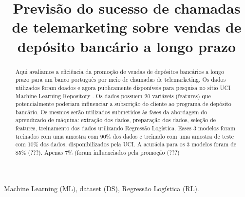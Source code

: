\documentclass[twoside,conference,a4paper]{IEEEtran}
\begin{document}
\renewcommand{\IEEEkeywordsname}{Palavras-chave}


\title{Previsão do sucesso de chamadas de telemarketing sobre vendas de depósito bancário a longo prazo}
\author{%
               
}


\maketitle

\begin{abstract}
Aqui avaliamos a eficiência da promoção de vendas de depósitos bancários a longo prazo para um banco português por meio de chamadas de telemarketing. Os dados utilizados foram doados e agora publicamente disponíveis para pesquisa no sítio UCI Machine Learning Repository \cite{UCI:2014}. Os dados possuem 20 variáveis (features) que potencialmente poderiam influenciar a subscrição do cliente ao programa de depósito bancário. Os mesmos serão utilizados submetidos às fases da abordagem do aprendizado de máquina: extração dos dados, preparação dos dados, seleção de features, treinamento dos dados utilizando Regressão Logística. Esses 3 modelos foram treinados com uma amostra com 90\% dos dados e treinado com uma amostra de teste com 10\% dos dados, disponibilizados pela UCI. A acurácia para os 3 modelos foram de 85\% (???). Apenas 7\% (foram influenciados pela promoção (???)
\end{abstract}

\begin{IEEEkeywords}
 Machine Learning (ML), dataset (DS), Regressão Logística (RL).
\end{IEEEkeywords}
\end{document}
